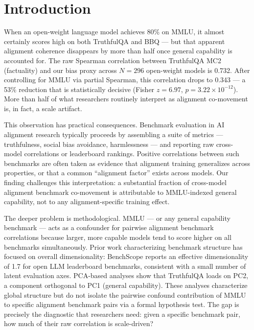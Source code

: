 \section{Introduction}

When an open-weight language model achieves 80\% on MMLU, it almost certainly scores high on both TruthfulQA and BBQ --- but that apparent alignment coherence disappears by more than half once general capability is accounted for. The raw Spearman correlation between TruthfulQA MC2 (factuality) and our bias proxy across $N{=}296$ open-weight models is 0.732. After controlling for MMLU via partial Spearman, this correlation drops to 0.343 --- a 53\% reduction that is statistically decisive (Fisher $z = 6.97$, $p = 3.22 \times 10^{-12}$). More than half of what researchers routinely interpret as alignment co-movement is, in fact, a scale artifact.

This observation has practical consequences. Benchmark evaluation in AI alignment research typically proceeds by assembling a suite of metrics --- truthfulness, social bias avoidance, harmlessness --- and reporting raw cross-model correlations or leaderboard rankings. Positive correlations between such benchmarks are often taken as evidence that alignment training generalizes across properties, or that a common ``alignment factor'' exists across models. Our finding challenges this interpretation: a substantial fraction of cross-model alignment benchmark co-movement is attributable to MMLU-indexed general capability, not to any alignment-specific training effect.

The deeper problem is methodological. MMLU \citep{hendrycks2021mmlu} --- or any general capability benchmark --- acts as a confounder for pairwise alignment benchmark correlations because larger, more capable models tend to score higher on all benchmarks simultaneously. Prior work characterizing benchmark structure has focused on overall dimensionality: BenchScope \citep{sha2026benchscope} reports an effective dimensionality of 1.7 for open LLM leaderboard benchmarks, consistent with a small number of latent evaluation axes. PCA-based analyses \citep{anon2026pca} show that TruthfulQA loads on PC2, a component orthogonal to PC1 (general capability). These analyses characterize global structure but do not isolate the pairwise confound contribution of MMLU to specific alignment benchmark pairs via a formal hypothesis test. The gap is precisely the diagnostic that researchers need: given a specific benchmark pair, how much of their raw correlation is scale-driven?

